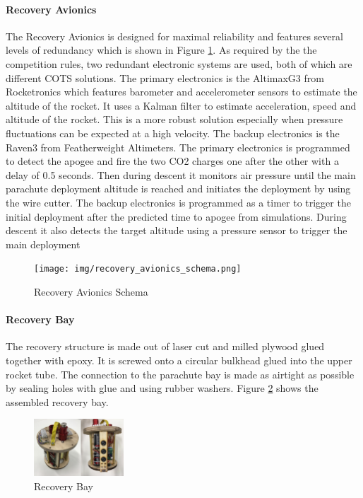  \paragraph{Recovery Avionics}
The Recovery Avionics is designed for maximal reliability and features several levels of redundancy which is shown in Figure \ref{f:recovery_avionics_schema}. As required by the the competition rules, two redundant electronic systems are used, both of which are different COTS solutions.
The primary electronics is the AltimaxG3 from Rocketronics which features barometer and accelerometer sensors to estimate the altitude of the rocket. It uses a Kalman filter to estimate acceleration, speed and altitude of the rocket. This is a more robust solution especially when pressure fluctuations can be expected at a high velocity.
The backup electronics is the Raven3 from Featherweight Altimeters.
The primary electronics is programmed to detect the apogee and fire the two CO2 charges one after the other with a delay of 0.5 seconds. Then during descent it monitors air pressure until the main parachute deployment altitude is reached and initiates the deployment by using the wire cutter.
 The backup electronics is programmed as a timer to trigger the initial deployment after the predicted time to apogee from simulations. During descent it also detects the target altitude using a pressure sensor to trigger the main deployment
 
  \begin{figure}[h!]
 	\centering
        \texttt{[image: img/recovery\_avionics\_schema.png]}
        \caption{Recovery Avionics Schema}
        \label{f:recovery_avionics_schema}
 \end{figure}
 

\paragraph{Recovery Bay} 
 The recovery structure is made out of laser cut and milled plywood glued together with epoxy. It is screwed onto a circular bulkhead glued into the upper rocket tube. The connection to the parachute bay is made as airtight as possible by sealing holes with glue and using rubber washers.
Figure \ref{f:recovery_bay} shows the assembled recovery bay.
 \begin{figure}[h!]
 	\centering
        \includegraphics[width=0.3\textwidth]{img/recovery_bay.jpg}
        \caption{Recovery Bay}
        \label{f:recovery_bay}
 \end{figure}
 
